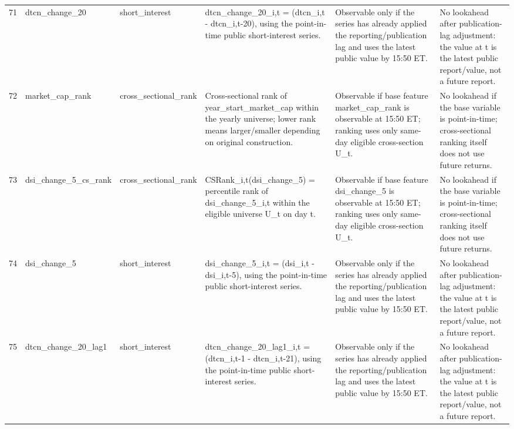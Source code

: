 \begin{landscape}
\begin{longtable}{P{0.42cm} P{2.25cm} P{2.05cm} P{5.25cm} P{4.85cm} P{5.25cm}}
71 & dtcn\_\allowbreak{}change\_\allowbreak{}20 & short\_\allowbreak{}interest & dtcn\_\allowbreak{}change\_\allowbreak{}20\_\allowbreak{}i,t = (dtcn\_\allowbreak{}i,t - dtcn\_\allowbreak{}i,t-20), using the point-in-time public short-interest series. & Observable only if the series has already applied the reporting/publication lag and uses the latest public value by 15:50 ET. & No lookahead after publication-lag adjustment: the value at t is the latest public report/value, not a future report. \\
72 & market\_\allowbreak{}cap\_\allowbreak{}rank & cross\_\allowbreak{}sectional\_\allowbreak{}rank & Cross-sectional rank of year\_\allowbreak{}start\_\allowbreak{}market\_\allowbreak{}cap within the yearly universe; lower rank means larger/smaller depending on original construction. & Observable if base feature market\_\allowbreak{}cap\_\allowbreak{}rank is observable at 15:50 ET; ranking uses only same-day eligible cross-section U\_\allowbreak{}t. & No lookahead if the base variable is point-in-time; cross-sectional ranking itself does not use future returns. \\
73 & dsi\_\allowbreak{}change\_\allowbreak{}5\_\allowbreak{}cs\_\allowbreak{}rank & cross\_\allowbreak{}sectional\_\allowbreak{}rank & CSRank\_\allowbreak{}i,t(dsi\_\allowbreak{}change\_\allowbreak{}5) = percentile rank of dsi\_\allowbreak{}change\_\allowbreak{}5\_\allowbreak{}i,t within the eligible universe U\_\allowbreak{}t on day t. & Observable if base feature dsi\_\allowbreak{}change\_\allowbreak{}5 is observable at 15:50 ET; ranking uses only same-day eligible cross-section U\_\allowbreak{}t. & No lookahead if the base variable is point-in-time; cross-sectional ranking itself does not use future returns. \\
74 & dsi\_\allowbreak{}change\_\allowbreak{}5 & short\_\allowbreak{}interest & dsi\_\allowbreak{}change\_\allowbreak{}5\_\allowbreak{}i,t = (dsi\_\allowbreak{}i,t - dsi\_\allowbreak{}i,t-5), using the point-in-time public short-interest series. & Observable only if the series has already applied the reporting/publication lag and uses the latest public value by 15:50 ET. & No lookahead after publication-lag adjustment: the value at t is the latest public report/value, not a future report. \\
75 & dtcn\_\allowbreak{}change\_\allowbreak{}20\_\allowbreak{}lag1 & short\_\allowbreak{}interest & dtcn\_\allowbreak{}change\_\allowbreak{}20\_\allowbreak{}lag1\_\allowbreak{}i,t = (dtcn\_\allowbreak{}i,t-1 - dtcn\_\allowbreak{}i,t-21), using the point-in-time public short-interest series. & Observable only if the series has already applied the reporting/publication lag and uses the latest public value by 15:50 ET. & No lookahead after publication-lag adjustment: the value at t is the latest public report/value, not a future report. \\
\end{longtable}
\end{landscape}
\endgroup